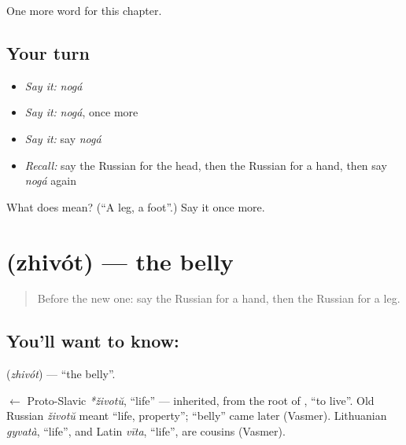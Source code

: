 \begin{grammarlens}[title={What you've built}]
One more word for this chapter.
\end{grammarlens}

\subsection*{Your turn}
\begin{itemize}
\raggedright
  \item \emph{Say it:} \emph{nogá}
  \item \emph{Say it:} \emph{nogá}, once more
  \item \emph{Say it:} say \emph{nogá}
  \item \emph{Recall:} say the Russian for the head, then the Russian for a hand, then say \emph{nogá} again
\end{itemize}

\begin{tcolorbox}[breakable,colback=teal!4,colframe=teal!35!black,title={Before you move on}]
What does  mean? (\textquotedblleft{}A leg, a foot\textquotedblright{}.) Say it once more.
\end{tcolorbox}
\section[\texorpdfstring{\ru{живот} (zhivót)}{живот (zhivót)}]{ (zhivót) — the belly}

\label{lesson:RU-C29-belly}



\begin{quote}
Before the new one: say the Russian for a hand, then the Russian for a leg.
\end{quote}

\subsection*{You'll want to know: }
\textbf{} (\emph{zhivót}) — \textquotedblleft{}the belly\textquotedblright{}.

\begin{cousinweb}
\textbf{} $\leftarrow$ Proto-Slavic \emph{*životŭ}, \textquotedblleft{}life\textquotedblright{} — inherited, from the root of \emph{}, \textquotedblleft{}to live\textquotedblright{}. Old Russian \emph{životŭ} meant \textquotedblleft{}life, property\textquotedblright{}; \textquotedblleft{}belly\textquotedblright{} came later (Vasmer). Lithuanian \emph{gyvatà}, \textquotedblleft{}life\textquotedblright{}, and Latin \emph{vīta}, \textquotedblleft{}life\textquotedblright{}, are cousins (Vasmer).
\end{cousinweb}

